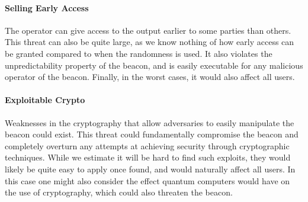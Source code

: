 \paragraph{Selling Early Access} The operator can give access to the output earlier to some parties than others. This threat can also be quite large, as we know nothing of how early access can be granted compared to when the randomness is used. It also violates the unpredictability property of the beacon, and is easily executable for any malicious operator of the beacon. Finally, in the worst cases, it would also affect all users.
\paragraph{Exploitable Crypto} Weaknesses in the cryptography that allow adversaries to easily manipulate the beacon could exist. This threat could fundamentally compromise the beacon and completely overturn any attempts at achieving security through cryptographic techniques. While we estimate it will be hard to find such exploits, they would likely be quite easy to apply once found, and would naturally affect all users. In this case one might also consider the effect quantum computers would have on the use of cryptography, which could also threaten the beacon.

